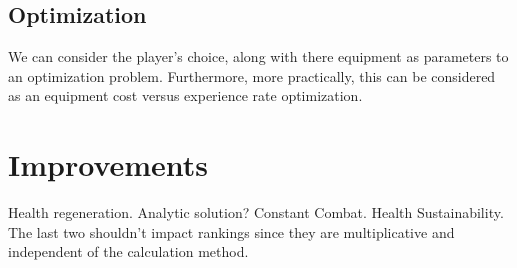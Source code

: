 \documentclass[../../main.tex]{subfiles}
\begin{document}
		\subsection{Optimization}
			We can consider the player's choice, along with there equipment as parameters to an optimization problem. Furthermore, more practically, this can be considered as an equipment cost versus experience rate optimization.

	\section{Improvements}
		Health regeneration. Analytic solution? Constant Combat. Health Sustainability. The last two shouldn't impact rankings since they are multiplicative and independent of the calculation method.
\end{document}
